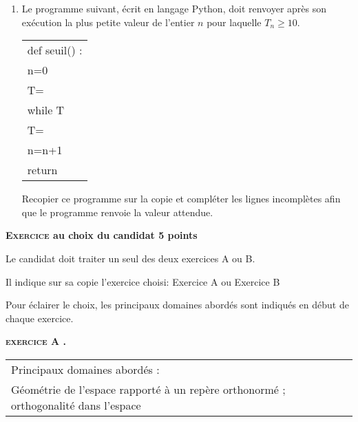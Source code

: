 \documentclass[11pt,a4paper,french]{article}
\begin{document}
\begin{enumerate}
\begin{enumerate}
\item Le programme suivant, écrit en langage Python, doit renvoyer après son exécution
la plus petite valeur de l'entier $n$ pour laquelle $T_n \geqslant 10$.

\vspace{0.5cm}

\begin{minipage}[]{5cm}
\begin{tabular}[]{|p{4.5cm}|}
\hline
def seuil() :\\
\hspace{1.2em}n=0\\
\hspace{1.2em}T= \dotfill\\
\hspace{1.2em}while T\dotfill\\
\hspace{4em}T= \dotfill\\
\hspace{4em}n=n+1\\
\hspace{1.2em}return\\
\hline
\end{tabular}
\end{minipage}
\hspace{1.5cm}
\begin{minipage}[]{5.6cm}
Recopier ce programme sur la copie
et compléter les lignes incomplètes
afin que le programme renvoie la valeur attendue.
\end{minipage}
\end{enumerate}
\end{enumerate}

\vspace{0,5cm}

\textbf{\textsc{Exercice} au choix du candidat \hfill 5 points}

\medskip

Le candidat doit traiter un seul des deux exercices A ou B.

Il indique sur sa copie l'exercice choisi: Exercice A ou Exercice B 

Pour éclairer le choix, les principaux domaines abordés sont indiqués en début de chaque exercice.  

 \vspace{0.5cm}
 
\textbf{\textsc{exercice A .}}

\vspace{0.75cm}
\begin{tabular}[]{|l|}
\hline
Principaux domaines abordés :\\

Géométrie de l'espace rapporté  à un repère orthonormé ; orthogonalité dans l'espace\\
\hline
\end{tabular}
\end{document}
